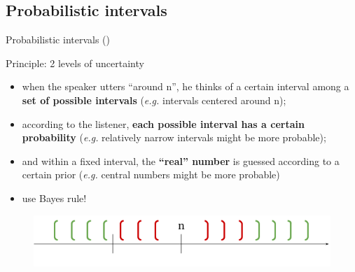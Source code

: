 \documentclass[xcolor=table, hyperref={pdfpagelabels=false}]{beamer}
\begin{document}
\subsection{Probabilistic intervals}
\begin{frame}{Probabilistic intervals \small (\cite{Egre2018pres})}
\begin{block}{Principle: 2 levels of uncertainty}
	\begin{itemize}
		\item when the speaker utters ``around n'', he thinks of a certain interval among a \textbf{set of possible intervals} (\textit{e.g.} intervals centered around n); \pause
		\item according to the listener, \textbf{each possible interval has a certain probability} (\textit{e.g.} relatively narrow intervals might be more probable); \pause
		\item and within a fixed interval, the \textbf{``real'' number} is guessed according to a certain prior (\textit{e.g.} central numbers might be more probable)
		\item use Bayes rule!
	\end{itemize}
\end{block}
\begin{figure}
	\includegraphics[width=\textwidth]{./images/intervals.png}
\end{figure}
\end{frame}
\end{document}
